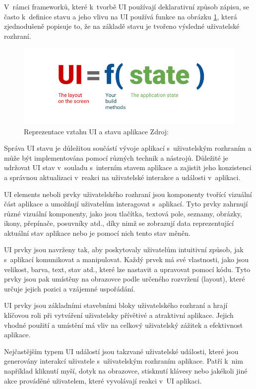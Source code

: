 V~rámci frameworků, které k~tvorbě UI používají deklarativní způsob zápisu, se často k~definice stavu a jeho vlivu na UI používá funkce 
na obrázku \ref{fig:UI_function}, která zjednodušeně popisuje to, že na základě stavu je tvořeno výsledné uživatelské rozhraní.

\begin{figure}[H]
  \centering
  \includegraphics[width=.5\textwidth]{ui-equals-function-of-state.png}
  \caption{Reprezentace vztahu UI a stavu aplikace Zdroj: \cite{imgUIformula}}
  \label{fig:UI_function}
\end{figure}

Správa UI stavu je důležitou součástí vývoje aplikací s~uživatelským rozhraním a může být implementována pomocí různých technik a nástrojů.
Důležité je udržovat UI stav v~souladu s~interním stavem aplikace a zajistit jeho konzistenci a správnou aktualizaci v~reakci na uživatelské 
interakce a události v~aplikaci.

UI elements neboli prvky uživatelského rozhraní jsou komponenty tvořící vizuální část aplikace a umožňují uživatelům interagovat s~aplikací.
Tyto prvky zahrnují různé vizuální komponenty, jako jsou tlačítka, textová pole, seznamy, obrázky, ikony, přepínače, posuvníky atd., díky nimž
se zobrazují data reprezentující aktuální stav aplikace nebo je pomocí nich tento stav měněn.

UI prvky jsou navrženy tak, aby poskytovaly uživatelům intuitivní způsob, jak s~aplikací komunikovat a manipulovat. Každý prvek má své 
vlastnosti, jako jsou velikost, barva, text, stav atd., které lze nastavit a upravovat pomocí kódu. Tyto prvky jsou pak umístěny na obrazovce 
podle určeného rozvržení (layout), které určuje jejich pozici a vzájemné uspořádání.

UI prvky jsou základními stavebními bloky uživatelského rozhraní a hrají klíčovou roli při vytváření uživatelsky přívětivé a atraktivní aplikace. 
Jejich vhodné použití a umístění má vliv na celkový uživatelský zážitek a efektivnost aplikace.

Nejčastějším typem UI událostí jsou takzvané uživatelské události, které jsou generovány interakcí uživatele s~uživatelským rozhraním aplikace. \cite{UIEvents}
Patří k~nim například kliknutí myší, dotyk na obrazovce, stisknutí klávesy nebo jakékoli jiné akce prováděné uživatelem, které vyvolávají reakci
v~UI aplikaci.

